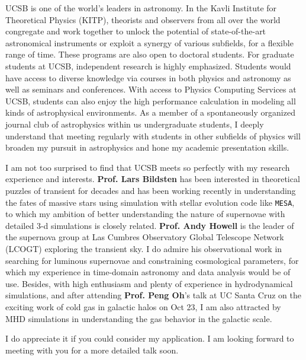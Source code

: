 \documentclass[11pt, a4paper]{awesome-cv} %
\begin{document}
\makecvheader %



\begin{cvletter}




UCSB is one of the world’s leaders in astronomy. In the Kavli Institute for Theoretical Physics (KITP), theorists and observers from all over the world congregate and work together to unlock the potential of state-of-the-art astronomical instruments or exploit a synergy of various subfields, for a flexible range of time. These programs are also open to doctoral students. For graduate students at UCSB, independent research is highly emphasized. Students would have access to diverse knowledge via courses in both physics and astronomy as well as seminars and conferences. With access to Physics Computing Services at UCSB, students can also enjoy the high performance calculation in modeling all kinds of astrophysical environments. As a member of a spontaneously organized journal club of astrophysics within us undergraduate students, I deeply understand that meeting regularly with students in other subfields of physics will broaden my pursuit in astrophysics and hone my academic presentation skills. 

I am not too surprised to find that UCSB meets so perfectly with my research experience and interests. \textbf{Prof. Lars Bildsten} has been interested in theoretical puzzles of transient for decades and has been working recently in understanding the fates of massive stars using simulation with stellar evolution code like \texttt{MESA}, to which my ambition of better understanding the nature of supernovae with detailed 3-d simulations is closely related. \textbf{Prof. Andy Howell} is the leader of the supernova group at Las Cumbres Observatory Global Telescope Network (LCOGT) exploring the transient sky. I do admire his observational work in searching for luminous supernovae and constraining cosmological parameters, for which my experience in time-domain astronomy and data analysis would be of use. Besides, with high enthusiasm and plenty of experience in hydrodynamical simulations, and after attending \textbf{Prof. Peng Oh}’s talk at UC Santa Cruz on the exciting work of cold gas in galactic halos on Oct 23, I am also attracted by MHD simulations in understanding the gas behavior in the galactic scale.

I do appreciate it if you could consider my application. I am looking forward to meeting with you for a more detailed talk soon.

\end{cvletter}


\end{document}
